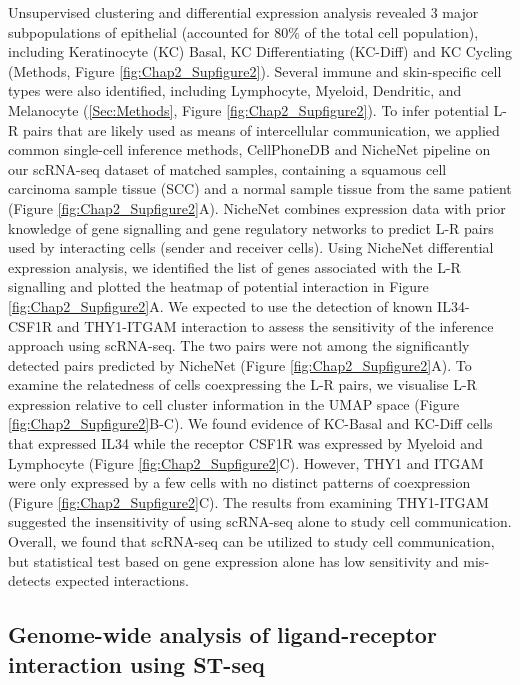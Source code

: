 Unsupervised clustering and differential expression analysis revealed 3 major subpopulations of epithelial (accounted for 80\% of the total cell population), including Keratinocyte (KC) Basal, KC Differentiating (KC-Diff) and KC Cycling (Methods, Figure \ref{fig:Chap2_Supfigure2}). Several immune and skin-specific cell types were also identified, including Lymphocyte, Myeloid, Dendritic, and Melanocyte (\ref{Sec:Methods}, Figure \ref{fig:Chap2_Supfigure2}). To infer potential L-R pairs that are likely used as means of intercellular communication, we applied common single-cell inference methods, CellPhoneDB \cite{efremova2020cellphonedb} and NicheNet pipeline \cite{browaeys2020nichenet} on our scRNA-seq dataset of matched samples, containing a squamous cell carcinoma sample tissue (SCC)  and a normal sample tissue from the same patient (Figure \ref{fig:Chap2_Supfigure2}A). NicheNet combines expression data with prior knowledge of gene signalling and gene regulatory networks to predict L-R pairs used by interacting cells (sender and receiver cells).  Using NicheNet differential expression analysis, we identified the list of genes associated with the L-R signalling and plotted the heatmap of potential interaction in  Figure \ref{fig:Chap2_Supfigure2}A. We expected to use the detection of known IL34-CSF1R \cite{lin2008discovery} and THY1-ITGAM \cite{wetzel2004human} interaction to assess the sensitivity of the inference approach using scRNA-seq. The two pairs were not among the significantly detected pairs predicted by NicheNet (Figure \ref{fig:Chap2_Supfigure2}A). To examine the relatedness of cells coexpressing the L-R pairs, we visualise L-R expression relative to cell cluster information in the UMAP space (Figure \ref{fig:Chap2_Supfigure2}B-C). We found evidence of KC-Basal and KC-Diff cells that expressed IL34 while the receptor CSF1R was expressed by Myeloid and Lymphocyte (Figure \ref{fig:Chap2_Supfigure2}C). However, THY1 and ITGAM were only expressed by a few cells with no distinct patterns of coexpression (Figure \ref{fig:Chap2_Supfigure2}C). The results from examining THY1-ITGAM suggested the insensitivity of using scRNA-seq alone to study cell communication. Overall, we found that scRNA-seq can be utilized to study cell communication, but statistical test based on gene expression alone has low sensitivity and mis-detects expected interactions.  

\subsection{Genome-wide analysis of ligand-receptor interaction using ST-seq}

